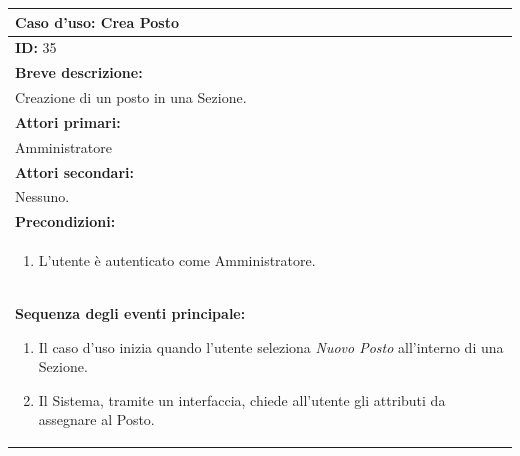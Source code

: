 \documentclass{article}
\begin{document}
                \begin{table}[H]
                    \begin{tabular}{|p{\linewidth}|}
                        \hline
                        \cellcolor{gray!100}
                        \color{white}
                        \centerline{\textbf{Caso d'uso:} Crea Posto} \\
                        \hline
                        \textbf{ID:} 35 \\
                        \hline
                        \cellcolor{gray!20}
                        \textbf{Breve descrizione:} \\
                        \cellcolor{gray!20}
                        Creazione di un posto in una Sezione. \\
                        \hline
                        \textbf{Attori primari:} \\
                        \begin{minipage}{\linewidth}
                            Amministratore
                        \end{minipage}
                        \vspace{-10pt} \\ 
                        \hline
                        \textbf{Attori secondari:} \\
                        Nessuno. \\
                        \hline
                        \cellcolor{gray!20}
                        \textbf{Precondizioni:} \\
                        \cellcolor{gray!20}
                        \begin{minipage}{\linewidth}
                            \begin{enumerate}
                                \item L'utente è autenticato come Amministratore.
                            \end{enumerate}
                        \end{minipage} \\
                        \hline
                        \textbf{Sequenza degli eventi principale:}
                        \begin{enumerate}
                            \item Il caso d'uso inizia quando l'utente seleziona \textit{Nuovo Posto} all'interno di una Sezione.
                            \item Il Sistema, tramite un interfaccia, chiede all'utente gli attributi da assegnare al Posto.

\end{enumerate}
\end{tabular}
\end{table}
\end{document}
